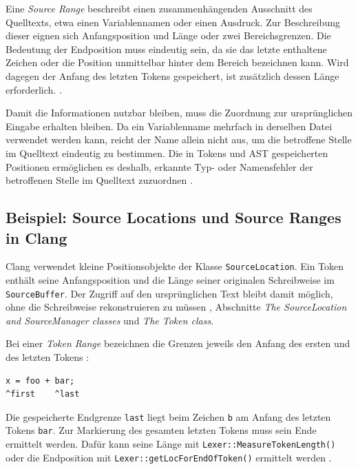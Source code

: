 \documentclass[11pt,a4paper]{article}
\newcommand{\code}[1]{\texttt{#1}}
\begin{document}
Eine \emph{Source Range} beschreibt einen zusammenhängenden Ausschnitt des Quelltexts, etwa einen Variablennamen oder einen Ausdruck. Zur Beschreibung dieser eignen sich Anfangsposition und Länge oder zwei Bereichsgrenzen. Die Bedeutung der Endposition muss eindeutig sein, da sie das letzte enthaltene Zeichen oder die Position unmittelbar hinter dem Bereich bezeichnen kann. Wird dagegen der Anfang des letzten Tokens gespeichert, ist zusätzlich dessen Länge erforderlich. \cite{clang,sourcelocation}.

Damit die Informationen nutzbar bleiben, muss die Zuordnung zur ursprünglichen Eingabe erhalten bleiben. Da ein Variablenname mehrfach in derselben Datei verwendet werden kann, reicht der Name allein nicht aus, um die betroffene Stelle im Quelltext eindeutig zu bestimmen. Die in Tokens und AST gespeicherten Positionen ermöglichen es deshalb, erkannte Typ- oder Namensfehler der betroffenen Stelle im Quelltext zuzuordnen \cite{clang}.

\subsection{Beispiel: Source Locations und Source Ranges in Clang}
Clang verwendet kleine Positionsobjekte der Klasse \code{SourceLocation}. Ein Token enthält seine Anfangsposition und die Länge seiner originalen Schreibweise im \code{SourceBuffer}. Der Zugriff auf den ursprünglichen Text bleibt damit möglich, ohne die Schreibweise rekonstruieren zu müssen \cite{clang}, Abschnitte \emph{The SourceLocation and SourceManager classes} und \emph{The Token class}.

Bei einer \emph{Token Range} bezeichnen die Grenzen jeweils den Anfang des ersten und des letzten Tokens \cite{clang}:
\par\noindent\begin{minipage}{\linewidth}
\begin{lstlisting}[caption={Originalbeispiel für eine Token Range}]
x = foo + bar;
^first    ^last
\end{lstlisting}
\end{minipage}\par
Die gespeicherte Endgrenze \code{last} liegt beim Zeichen \code{b} am Anfang des letzten Tokens \code{bar}. Zur Markierung des gesamten letzten Tokens muss sein Ende ermittelt werden. Dafür kann seine Länge mit \code{Lexer::MeasureTokenLength()} oder die Endposition mit \code{Lexer::getLocForEndOfToken()} ermittelt werden \cite{clang}.
\end{document}
